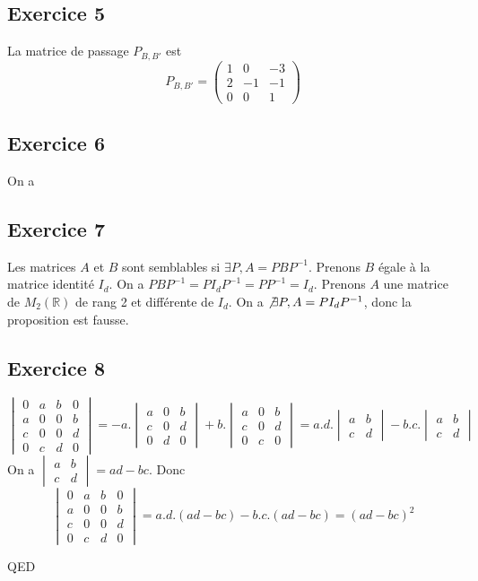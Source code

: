 \documentclass[]{book}
\theoremstyle{definition}
\newcommand{\bb}[1]{\mathbb{#1}}
\newcommand{\R}{\bb{R}}
\begin{document}
\subsection*{Exercice 5}
La matrice de passage $P_{B,B'}$ est 
$$
P_{B,B'} = \begin{pmatrix}1&0&-3\\2&-1&-1\\0&0&1\end{pmatrix}
$$


\subsection*{Exercice 6}
On a 


\subsection*{Exercice 7}
Les matrices $A$ et $B$ sont semblables si $\exists P, A = PBP^{-1}$. 
Prenons $B$ \'egale \`a la matrice identit\'e $I_{d}$. On a $PBP^{-1} = PI_{d}P^{-1} = PP^{-1} = I_{d}$. Prenons $A$ une matrice de $M_2(\R)$ de rang 2 et diff\'erente de $I_d$. On a $\not\exists P, A = PI_{d}P^{-1}$, donc la proposition est fausse.


\subsection*{Exercice 8}
$$
\begin{vmatrix} 0 & a & b & 0\\ a & 0 & 0 & b\\ c & 0 & 0 & d\\ 0 & c & d & 0\end{vmatrix} =
-a.\begin{vmatrix} a & 0 & b\\ c & 0 & d\\ 0 & d & 0\end{vmatrix} + b.\begin{vmatrix} a & 0 & b\\ c & 0 & d\\ 0 & c & 0\end{vmatrix} =
a.d.\begin{vmatrix} a & b\\ c & d\end{vmatrix} - b.c.\begin{vmatrix} a & b\\ c & d\end{vmatrix}
$$
On a $\begin{vmatrix} a & b\\ c & d\end{vmatrix} = ad-bc$. Donc 
$$
\begin{vmatrix} 0 & a & b & 0\\ a & 0 & 0 & b\\ c & 0 & 0 & d\\ 0 & c & d & 0\end{vmatrix} = a.d.(ad-bc) - b.c.(ad-bc) = (ad-bc)^2
$$ 

QED
\end{document}
